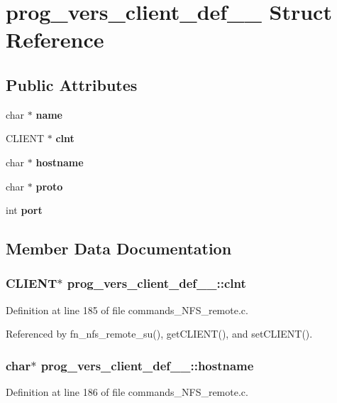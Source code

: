 \section{prog\_\-vers\_\-client\_\-def\_\-\_\- Struct Reference}
\label{structprog__vers__client__def____}
\subsection*{Public Attributes}
\begin{CompactItemize}
\item 
char $\ast$ {\bf name}
\item 
CLIENT $\ast$ {\bf clnt}
\item 
char $\ast$ {\bf hostname}
\item 
char $\ast$ {\bf proto}
\item 
int {\bf port}
\end{CompactItemize}


\subsection{Member Data Documentation}
\subsubsection{\setlength{\rightskip}{0pt plus 5cm}CLIENT$\ast$ {\bf prog\_\-vers\_\-client\_\-def\_\-\_\-::clnt}}\label{structprog__vers__client__def_____o1}




Definition at line 185 of file commands\_\-NFS\_\-remote.c.

Referenced by fn\_\-nfs\_\-remote\_\-su(), get\-CLIENT(), and set\-CLIENT().
\subsubsection{\setlength{\rightskip}{0pt plus 5cm}char$\ast$ {\bf prog\_\-vers\_\-client\_\-def\_\-\_\-::hostname}}\label{structprog__vers__client__def_____o2}




Definition at line 186 of file commands\_\-NFS\_\-remote.c.


